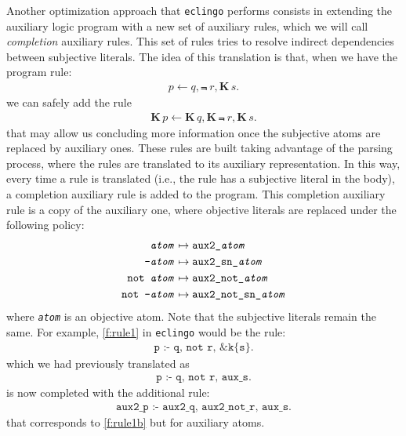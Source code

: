 \documentclass{new_tlp}
\def\K{\mathbf{K}\, }
\def\eclingo{{\tt eclingo}}
\def\\wviews{{\tt \wviews}}
\def\wviews{{\tt wviews}}
\begin{document}
Another optimization approach that \eclingo{} performs consists in extending the auxiliary logic program with a new set of auxiliary rules, which we will call \emph{completion} auxiliary rules. This set of rules tries to resolve indirect dependencies between subjective literals.
The idea of this translation is that, when we have the program rule:
\begin{eqnarray}
p \leftarrow q, \Not \ r, \K s.\label{f:rule1}
\end{eqnarray}
we can safely add the rule
\begin{eqnarray}
\K p \leftarrow \K q, \K \Not \ r, \K s. \label{f:rule1b}
\end{eqnarray}
that may allow us concluding more information once the subjective atoms are replaced by auxiliary ones.
These rules are built taking advantage of the parsing process, where the rules are translated to its auxiliary representation. In this way, every time a rule is translated (i.e., the rule has a subjective literal in the body), a completion auxiliary rule is added to the program. This completion auxiliary rule is a copy of the auxiliary one, where objective literals are replaced under the following policy:
\begin{align*}
    \texttt{\emph{atom}} & \mapsto \texttt{aux2\_\emph{atom}} \\
    \texttt{{-}\emph{atom}} & \mapsto \texttt{aux2\_sn\_\emph{atom}} \\
    \texttt{not \emph{atom}} & \mapsto \texttt{aux2\_not\_\emph{atom}} \\
    \texttt{not {-}\emph{atom}} & \mapsto \texttt{aux2\_not\_sn\_\emph{atom}}
\end{align*}
where \texttt{\emph{atom}} is an objective atom. Note that the subjective literals remain the same. For example, \eqref{f:rule1} in \eclingo{} would be the rule:
\begin{align*}
    \texttt{p\ :-\ q,\ not\ r,\ \&k\{s\}.}
\end{align*}
which we had previously translated as
\begin{align*}
    \texttt{p\ :-\ q,\ not\ r,\ aux\_s.}
\end{align*}
is now completed with the additional rule:
\begin{align*}
    \texttt{aux2\_p\ :-\ aux2\_q,\ aux2\_not\_r,\ aux\_s.}
\end{align*}
that corresponds to \eqref{f:rule1b} but for auxiliary atoms.
\end{document}
